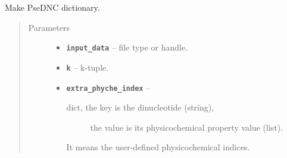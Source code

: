 \documentclass[letterpaper,10pt,english]{sphinxmanual}
\begin{document}
\begin{fulllineitems}
\label{reference/PyDNApsenac:PyDNApsenac.GetPseDNC}
Make PseDNC dictionary.
\begin{quote}\begin{description}
\item[{Parameters}] \leavevmode\begin{itemize}
\item {} 
\textbf{\texttt{input\_data}} -- file type or handle.

\item {} 
\textbf{\texttt{k}} -- k-tuple.

\item {} 
\textbf{\texttt{extra\_phyche\_index}} -- \begin{description}
\item[{dict, the key is the dinucleotide (string),}] \leavevmode
the value is its physicochemical property value (list).

\end{description}

It means the user-defined physicochemical indices.


\end{itemize}

\end{description}\end{quote}

\end{fulllineitems}

\end{document}
